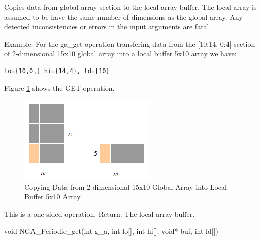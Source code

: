 \documentclass[12pt]{article}
\begin{document}
\begin{desc}

  Copies data from global array section to the local array buffer. The
  local array is assumed to be have the same number of dimensions as
  the global array. Any detected inconsistencies or errors in the input
  arguments are fatal.

Example: For the ga_get operation transfering data from the [10:14, 0:4]
section of 2-dimensional 15x10 global array into a local buffer 5x10
array we have: 

\begin{verbatim}
lo={10,0,} hi={14,4}, ld={10}  
\end{verbatim}

Figure \ref{get} shows the GET operation.

\begin{figure}
\centering
\includegraphics{GET}
\caption{Copying Data from 2-dimensional 15x10 Global Array into Local Buffer 5x10 Array}
\label{get}
\end{figure}

This is a one-sided operation.
Return: The local array buffer.

 \end{desc}


\begin{capi}
\begin{ccode}
void NGA_Periodic_get(int g_a, int lo[], int hi[], void* buf, int ld[])
\end{ccode}
\begin{funcargs}
\end{funcargs}
\end{capi}
\end{document}
